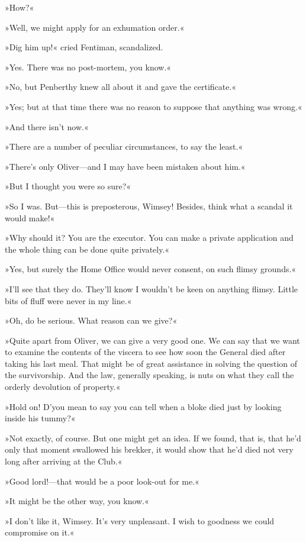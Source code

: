 »How?«

»Well, we might apply for an exhumation order.«

»Dig him up!« cried Fentiman, scandalized.

»Yes. There was no post-mortem, you know.«

»No, but Penberthy knew all about it and gave the certificate.«

»Yes; but at that time there was no reason to suppose that anything was wrong.«

»And there isn't now.«

»There are a number of peculiar circumstances, to say the least.«

»There's only Oliver\allowbreak---\allowbreak and I may have been mistaken about him.«

»But I thought you were so sure?«

»So I was. But\allowbreak---\allowbreak this is preposterous, Wimsey! Besides, think what a scandal it would make!«

»Why should it? You are the executor. You can make a private application and the whole thing can be done quite privately.«

»Yes, but surely the Home Office would never consent, on such flimsy grounds.«

»I'll see that they do. They'll know I wouldn't be keen on anything flimsy. Little bits of fluff were never in my line.«

»Oh, do be serious. What reason can we give?«

»Quite apart from Oliver, we can give a very good one. We can say that we want to examine the contents of the viscera to see how soon the General died after taking his last meal. That might be of great assistance in solving the question of the survivorship. And the law, generally speaking, is nuts on what they call the orderly devolution of property.«

»Hold on! D'you mean to say you can tell when a bloke died just by looking inside his tummy?«

»Not exactly, of course. But one might get an idea. If we found, that is, that he'd only that moment swallowed his brekker, it would show that he'd died not very long after arriving at the Club.«

»Good lord!---that would be a poor look-out for me.«

»It might be the other way, you know.«

»I don't like it, Wimsey. It's very unpleasant. I wish to goodness we could compromise on it.«

